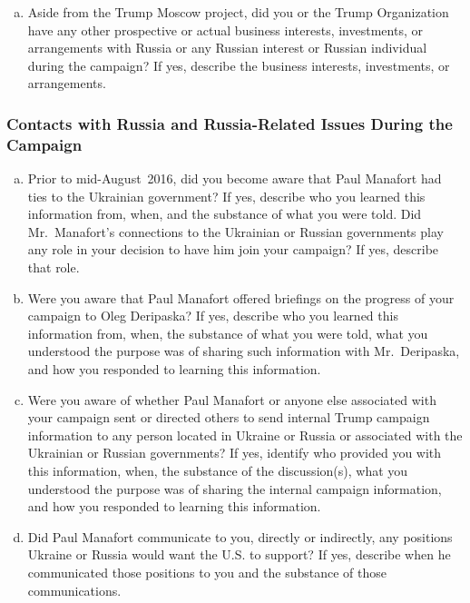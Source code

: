 \begin{enumerate}[a.]
\item Aside from the Trump Moscow project, did you or the Trump Organization have any other prospective or actual business interests, investments, or arrangements with Russia or any Russian interest or Russian individual during the campaign?
If yes, describe the business interests, investments, or arrangements.

\end{enumerate}

\subsubsection{Contacts with Russia and Russia-Related Issues During the Campaign}

\begin{enumerate}[a.]

\item Prior to mid-August~2016, did you become aware that Paul Manafort had ties to the Ukrainian government?
If yes, describe who you learned this information from, when, and the substance of what you were told.
Did Mr.~Manafort's connections to the Ukrainian or Russian governments play any role in your decision to have him join your campaign?
If yes, describe that role.

\item Were you aware that Paul Manafort offered briefings on the progress of your campaign to Oleg Deripaska?
If yes, describe who you learned this information from, when, the substance of what you were told, what you understood the purpose was of sharing such information with Mr.~Deripaska, and how you responded to learning this information.

\item Were you aware of whether Paul Manafort or anyone else associated with your campaign sent or directed others to send internal Trump campaign information to any person located in Ukraine or Russia or associated with the Ukrainian or Russian governments?
If yes, identify who provided you with this information, when, the substance of the discussion(s), what you understood the purpose was of sharing the internal campaign information, and how you responded to learning this information.

\item Did Paul Manafort communicate to you, directly or indirectly, any positions Ukraine or Russia would want the U.S. to support?
If yes, describe when he communicated those positions to you and the substance of those communications.


\end{enumerate}

